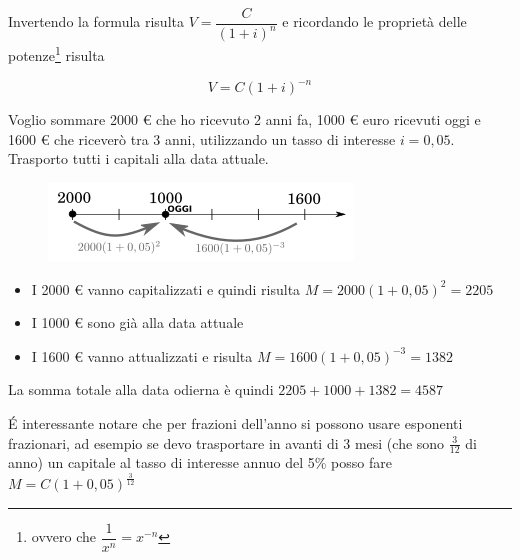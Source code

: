 Invertendo la formula risulta $V=\dfrac{C}{(1+i)^n}$ e ricordando le proprietà 
delle potenze\footnote{ovvero che $\dfrac{1}{x^n}=x^{-n}$} risulta



\begin{definizione}[Attualizzazione] $$ V=C(1+i)^{-n}$$ \end{definizione} 
\begin{exrig} \begin{esempio} Voglio sommare 2000 € che ho ricevuto 2 anni fa, 
1000 € euro ricevuti oggi e 1600 € che riceverò tra 3 anni, utilizzando un tasso 
di interesse $i=0,05$. Trasporto tutti i capitali alla data attuale. 
\begin{figure}[htp] \centering \includegraphics[scale=.60]{img/esempio.png} 
\end{figure} \begin{itemize} \item I 2000 € vanno capitalizzati e quindi risulta 
$M=2000(1+0,05)^2=2205$ \item I 1000 € sono già alla data attuale \item I 1600 € 
vanno attualizzati e risulta $M=1600(1+0,05)^{-3}=1382$ \end{itemize} La somma 
totale alla data odierna è quindi $2205+1000+1382=4587$ \end{esempio} 
\end{exrig}

\'E interessante notare che per frazioni dell'anno si possono usare esponenti 
frazionari, ad esempio se devo trasportare in avanti di 3 mesi (che sono 
$\frac{3}{12}$ di anno) un capitale al tasso di interesse annuo del 5\% posso 
fare $M=C(1+0,05)^{\frac{3}{12}}$





